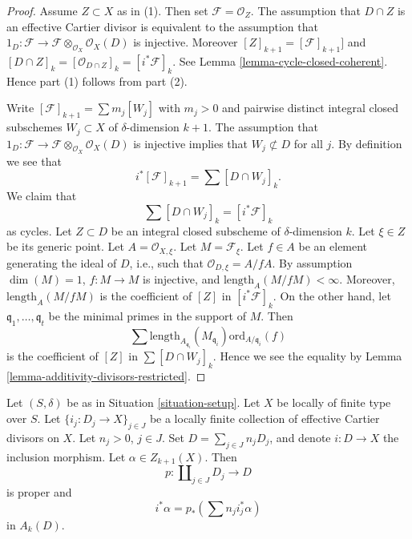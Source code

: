 \begin{proof}
Assume $Z \subset X$ as in (1). Then set $\mathcal{F} = \mathcal{O}_Z$.
The assumption that $D \cap Z$ is an effective Cartier divisor is
equivalent to the assumption that
$1_D : \mathcal{F} \to \mathcal{F} \otimes_{\mathcal{O}_X} \mathcal{O}_X(D)$
is injective. Moreover $[Z]_{k + 1} = [\mathcal{F}]_{k + 1}]$
and $[D \cap Z]_k = [\mathcal{O}_{D \cap Z}]_k = [i^*\mathcal{F}]_k$.
See Lemma \ref{lemma-cycle-closed-coherent}.
Hence part (1) follows from part (2).

\medskip\noindent
Write $[\mathcal{F}]_{k + 1} = \sum m_j[W_j]$ with $m_j > 0$
and pairwise distinct integral closed subschemes $W_j \subset X$
of $\delta$-dimension $k + 1$. The assumption that
$1_D : \mathcal{F} \to \mathcal{F} \otimes_{\mathcal{O}_X} \mathcal{O}_X(D)$
is injective implies that $W_j \not \subset D$ for all $j$.
By definition we see that
$$
i^*[\mathcal{F}]_{k + 1} = \sum [D \cap W_j]_k.
$$
We claim that
$$
\sum [D \cap W_j]_k = [i^*\mathcal{F}]_k
$$
as cycles.
Let $Z \subset D$ be an integral closed subscheme of $\delta$-dimension
$k$. Let $\xi \in Z$ be its generic point. Let $A = \mathcal{O}_{X, \xi}$.
Let $M = \mathcal{F}_\xi$. Let $f \in A$ be an element generating the
ideal of $D$, i.e., such that $\mathcal{O}_{D, \xi} = A/fA$.
By assumption $\dim(M) = 1$, $f : M \to M$ is injective, and
$\text{length}_A(M/fM) < \infty$. Moreover, $\text{length}_A(M/fM)$
is the coefficient of $[Z]$ in $[i^*\mathcal{F}]_k$. On the
other hand, let $\mathfrak q_1, \ldots, \mathfrak q_t$ be the minimal
primes in the support of $M$. Then
$$
\sum
\text{length}_{A_{\mathfrak q_i}}(M_{\mathfrak q_i})
\text{ord}_{A/\mathfrak q_i}(f)
$$
is the coefficient of $[Z]$ in $\sum [D \cap W_j]_k$.
Hence we see the equality by
Lemma \ref{lemma-additivity-divisors-restricted}.
\end{proof}

\begin{lemma}
\label{lemma-improved-additivity}
Let $(S, \delta)$ be as in Situation \ref{situation-setup}.
Let $X$ be locally of finite type over $S$.
Let $\{i_j : D_j \to X \}_{j \in J}$ be a locally finite collection
of effective Cartier divisors on $X$. Let $n_j > 0$, $j\in J$.
Set $D = \sum_{j \in J} n_j D_j$, and denote $i : D \to X$ the
inclusion morphism. Let $\alpha \in Z_{k + 1}(X)$. Then
$$
p : \coprod\nolimits_{j \in J} D_j \longrightarrow D
$$
is proper and
$$
i^*\alpha = p_*\left(\sum n_j i_j^*\alpha\right)
$$
in $A_k(D)$.
\end{lemma}

